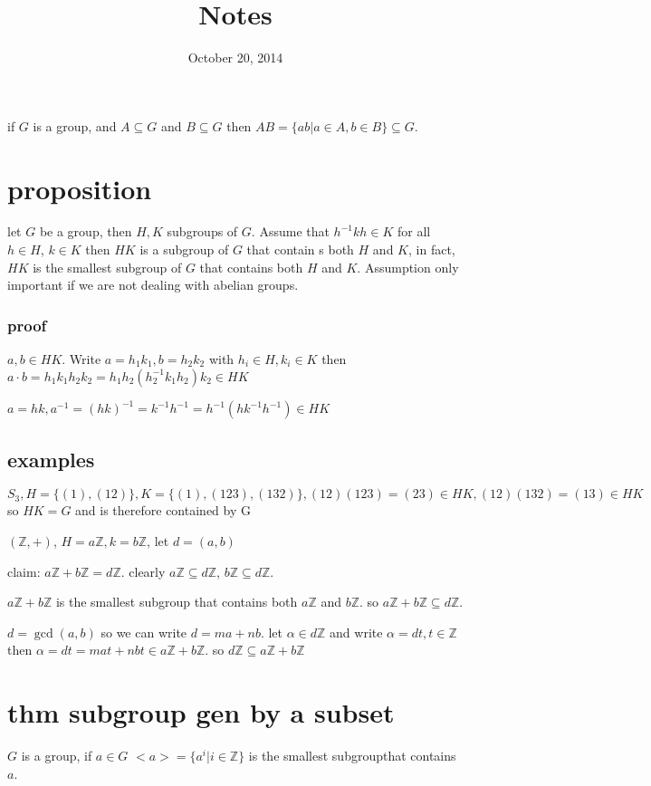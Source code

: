 \documentclass[letterpaper]{article}
\begin{document}
\title{Notes}
\date{October 20, 2014}
\maketitle
if $G$ is a group, and $A\subseteq G$ and $B\subseteq G$ then $AB=\{ab|a\in A, b\in B\}\subseteq G$.

\section*{proposition}

let $G$ be a group, then $H,K$ subgroups of $G$. Assume that $h^{-1}kh\in K$ for all $h\in H$, $k\in K$ then $HK$ is a subgroup of $G$ that contain s both $H$ and $K$, in fact, $HK$ is the smallest subgroup of $G$ that contains both $H$ and $K$. Assumption only important if we are not dealing with abelian groups.

\subsubsection*{proof}
$a,b\in HK$. Write $a=h_1k_1,b=h_2k_2$ with $h_i\in H,k_i\in K$ then $a\cdot b=h_1k_1h_2k_2=h_1h_2(h_2^{-1}k_1h_2)k_2\in HK$

$a=hk, a^{-1}=(hk)^{-1}=k^{-1}h^{-1}=h^{-1}(hk^{-1}h^{-1})\in HK$

\subsection*{examples}
$S_3, H=\{(1),(12)\}, K=\{(1),(123),(132)\}, (12)(123)=(23)\in HK, (12)(132)=(13)\in HK$ so $HK=G$ and is therefore contained by G

$(\mathbb{Z},+)$, $H=a\mathbb{Z}, k=b\mathbb{Z}$, let $d=(a,b)$

claim: $a\mathbb{Z}+b\mathbb{Z}=d\mathbb{Z}$. clearly $a\mathbb{Z}\subseteq d\mathbb{Z}$, $b\mathbb{Z}\subseteq d\mathbb{Z}$. 

$a\mathbb{Z}+b\mathbb{Z}$ is the smallest subgroup that contains both $a\mathbb{Z}$ and $b\mathbb{Z}$. so $a\mathbb{Z}+b\mathbb{Z}\subseteq d\mathbb{Z}$.

$d=\gcd(a,b)$ so we can write $d=ma+nb$. let $\alpha\in d\mathbb{Z}$ and write $\alpha=dt, t\in \mathbb{Z}$ then $\alpha=dt=mat+nbt\in a\mathbb{Z}+b\mathbb{Z}$. so $d\mathbb{Z}\subseteq a\mathbb{Z}+b\mathbb{Z}$ 
\section*{thm subgroup gen by a subset}
$G$ is a group, if $a\in G$ $<a>=\{a^i|i\in \mathbb{Z}\}$ is the smallest subgroupthat contains $a$.
\end{document}
